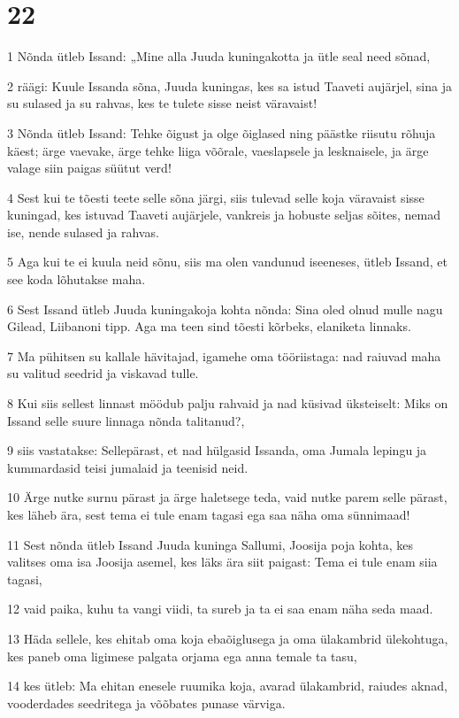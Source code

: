 \chapter{22}

\par 1 Nõnda ütleb Issand: „Mine alla Juuda kuningakotta ja ütle seal need sõnad,
\par 2 räägi: Kuule Issanda sõna, Juuda kuningas, kes sa istud Taaveti aujärjel, sina ja su sulased ja su rahvas, kes te tulete sisse neist väravaist!
\par 3 Nõnda ütleb Issand: Tehke õigust ja olge õiglased ning päästke riisutu rõhuja käest; ärge vaevake, ärge tehke liiga võõrale, vaeslapsele ja lesknaisele, ja ärge valage siin paigas süütut verd!
\par 4 Sest kui te tõesti teete selle sõna järgi, siis tulevad selle koja väravaist sisse kuningad, kes istuvad Taaveti aujärjele, vankreis ja hobuste seljas sõites, nemad ise, nende sulased ja rahvas.
\par 5 Aga kui te ei kuula neid sõnu, siis ma olen vandunud iseeneses, ütleb Issand, et see koda lõhutakse maha.
\par 6 Sest Issand ütleb Juuda kuningakoja kohta nõnda: Sina oled olnud mulle nagu Gilead, Liibanoni tipp. Aga ma teen sind tõesti kõrbeks, elaniketa linnaks.
\par 7 Ma pühitsen su kallale hävitajad, igamehe oma tööriistaga: nad raiuvad maha su valitud seedrid ja viskavad tulle.
\par 8 Kui siis sellest linnast möödub palju rahvaid ja nad küsivad üksteiselt: Miks on Issand selle suure linnaga nõnda talitanud?,
\par 9 siis vastatakse: Sellepärast, et nad hülgasid Issanda, oma Jumala lepingu ja kummardasid teisi jumalaid ja teenisid neid.
\par 10 Ärge nutke surnu pärast ja ärge haletsege teda, vaid nutke parem selle pärast, kes läheb ära, sest tema ei tule enam tagasi ega saa näha oma sünnimaad!
\par 11 Sest nõnda ütleb Issand Juuda kuninga Sallumi, Joosija poja kohta, kes valitses oma isa Joosija asemel, kes läks ära siit paigast: Tema ei tule enam siia tagasi,
\par 12 vaid paika, kuhu ta vangi viidi, ta sureb ja ta ei saa enam näha seda maad.
\par 13 Häda sellele, kes ehitab oma koja ebaõiglusega ja oma ülakambrid ülekohtuga, kes paneb oma ligimese palgata orjama ega anna temale ta tasu,
\par 14 kes ütleb: Ma ehitan enesele ruumika koja, avarad ülakambrid, raiudes aknad, vooderdades seedritega ja võõbates punase värviga.
